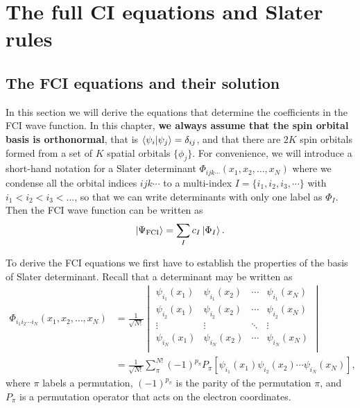\documentclass[../Main/chem532-notes.tex]{subfiles}
\begin{document}
\chapter{The full CI equations and Slater rules}

\section{The FCI equations and their solution}

In this section we will derive the equations that determine the coefficients in the FCI wave function.
In this chapter, \textbf{we always assume that the spin orbital basis is orthonormal}, that is $\braket{\psi_i|\psi_j} = \delta_{ij}$, and that there are $2K$ spin orbitals formed from a set of $K$ spatial orbitals $\{\phi_j\}$.
For convenience, we will introduce a short-hand notation for a Slater determinant $\Phi_{ijk\cdots}(x_1,x_2,\ldots,x_N)$ where we condense all the orbital indices ${ijk\cdots}$ to a multi-index $I = \{i_1,i_2,i_3,\cdots\}$ with $i_1 < i_2 < i_3 < \ldots$, so that we can write determinants with only one label as $\Phi_I$.
Then the FCI wave function can be written as
\begin{equation}
\ket{\Psi_{\mathrm{FCI}}} = \sum_I c_I \ket{\Phi_I}.
\end{equation}

To derive the FCI equations we first have to establish the properties of the basis of Slater determinant.
Recall that a determinant may be written as
\begin{equation}
\begin{split}
\Phi_{i_1 i_2 \cdots i_N}(x_1,x_2,\ldots,x_N) &= \frac{1}{\sqrt{N!}}
\begin{vmatrix}
\psi_{i_1}(x_1) & \psi_{i_1}(x_2) & \cdots & \psi_{i_1}(x_N) \\
\psi_{i_2}(x_1) & \psi_{i_2}(x_2) & \cdots & \psi_{i_2}(x_N) \\
\vdots & \vdots & \ddots &  \vdots \\
\psi_{i_N}(x_1) & \psi_{i_N}(x_2) & \cdots & \psi_{i_N}(x_N) \\
\end{vmatrix} \\
&= \frac{1}{\sqrt{N!}}
\sum_{\pi}^{N!} (-1)^{p_\pi} P_{\pi}\left[
\psi_{i_1}(x_1) \psi_{i_2}(x_2) \cdots \psi_{i_N}(x_N)
\right],
\end{split}
\end{equation}
where $\pi$ labels a permutation, $(-1)^{p_\pi}$ is the parity of the permutation $\pi$, and $P_{\pi}$ is a permutation operator that acts on the electron coordinates.
\end{document}
